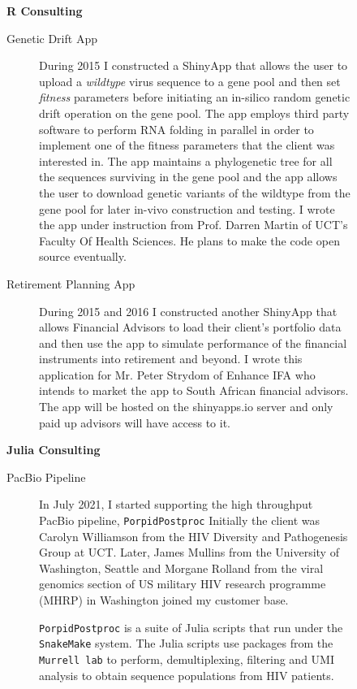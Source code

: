 \newpage
\begin{description}\item[] \begin{description}\item[] {\large \bf  R Consulting }
\begin{description}
 \item[ Genetic Drift App   ]  During 2015 I constructed a ShinyApp
 that allows the user to upload a {\it wildtype} virus sequence  to a gene pool and then set {\it fitness} parameters before
 initiating an in-silico random genetic drift operation on the gene pool. The app employs third party software
 to perform RNA folding in parallel in order to implement one of the fitness parameters that the client was interested in.
 The app maintains a phylogenetic tree for all the sequences surviving in the gene pool and the app allows
 the user to download genetic variants of the wildtype from the gene pool for later in-vivo construction and testing.
 I wrote the app under instruction from Prof. Darren Martin of UCT's Faculty Of Health Sciences. 
 He plans to make the code open source eventually.

 \item[ Retirement Planning  App   ]  During 2015 and 2016 I constructed another ShinyApp
 that allows Financial Advisors to load their client's portfolio data and then use the app to simulate
 performance of the financial instruments into retirement and beyond. I wrote this application for Mr. Peter Strydom of Enhance IFA
 who intends to market the app to South African financial advisors. The app will be hosted on the shinyapps.io server
 and only paid up advisors will have access to it.
 
 \end{description}
 \end{description}
\end{description}


\begin{description}\item[] \begin{description}\item[] {\large \bf  Julia Consulting }
\begin{description}
 \item[ PacBio Pipeline   ]  In July 2021, I started supporting the high throughput PacBio pipeline, {\tt PorpidPostproc}
 Initially the client was Carolyn Williamson from the HIV Diversity and Pathogenesis Group at UCT. 
 Later, James Mullins from the University of Washington, Seattle 
 and Morgane Rolland from the viral genomics section of US military HIV research programme (MHRP) in Washington
 joined my customer base. 
 
 {\tt PorpidPostproc} is a suite of Julia scripts that run under the {\tt SnakeMake} system. The Julia scripts use packages 
 from the {\tt Murrell lab} to perform, demultiplexing, filtering and UMI analysis to obtain sequence populations from HIV 
 patients.
 
\end{description}
\end{description}
\end{description}



\label{f0}

